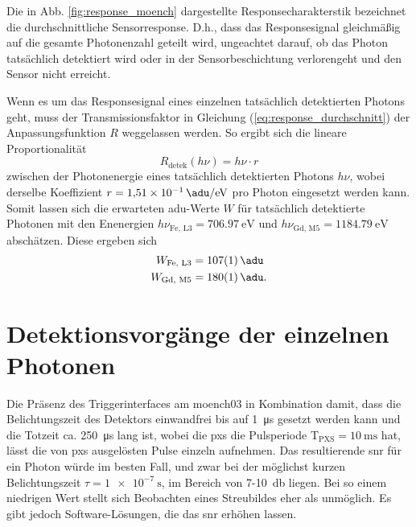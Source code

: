 \noindent
Die in Abb. \ref{fig:response_moench} dargestellte Responsecharakterstik bezeichnet die durchschnittliche Sensorresponse. D.h., dass das Responsesignal gleichmäßig auf die gesamte Photonenzahl geteilt wird, ungeachtet darauf, ob das Photon tatsächlich detektiert wird oder in der Sensorbeschichtung verlorengeht und den Sensor nicht erreicht.

\noindent
Wenn es um das Responsesignal eines einzelnen tatsächlich detektierten Photons geht, muss der Transmissionsfaktor in Gleichung (\ref{eq:response_durchschnitt}) der Anpassungsfunktion $R$ weggelassen werden. So ergibt sich die lineare Proportionalität
\begin{equation}
    R_\text{detek}(h\nu) = h\nu \cdot r
    \label{eq:adu_to_ev}
\end{equation}
zwischen der Photonenergie eines tatsächlich detektierten Photons $h\nu$, wobei derselbe Koeffizient $r = \SI{1.51e-1}{\adu\per\eV}$ pro Photon eingesetzt werden kann. Somit lassen sich die erwarteten \gls{adu}-Werte $W$ für tatsächlich detektierte Photonen mit den Enenergien $h\nu_{\text{Fe, L3}} = \SI{706.97}{\eV}$ und $h\nu_{\text{Gd, M5}} = \SI{1184.79}{\eV}$ abschätzen. Diese ergeben sich 
\begin{equation}
\begin{split}
     W_{\text{Fe, L3}} &=  \SI{107(1)}{\adu}\\
     W_{\text{Gd, M5}} &=  \SI{180(1)}{\adu}.
\end{split}
\label{eq:auselesewerte_fe_gd}
\end{equation}


\section{Detektionsvorgänge der einzelnen Photonen}
\label{text:single_photon_theorie}
Die Präsenz des Triggerinterfaces am \gls{moench03} in Kombination damit, dass die Belichtungszeit des Detektors einwandfrei bis auf \SI{1}{\micro\second} gesetzt werden kann und die Totzeit ca. \SI{250}{\micro\second} lang ist, wobei die \gls{pxs} die Pulsperiode T$_\text{PXS} = \SI{10}{\milli\second}$ hat, lässt die von \gls{pxs} ausgelösten Pulse einzeln aufnehmen. Das resultierende \gls{snr} für ein Photon würde im besten Fall, und zwar bei der möglichst kurzen Belichtungszeit $\tau = \SI{1e-7}{\second}$, im Bereich von 7-\SI{10}{\decibel} liegen. Bei so einem niedrigen Wert stellt sich Beobachten eines Streubildes eher als unmöglich. Es gibt jedoch Software-Lösungen, die das \gls{snr} erhöhen lassen.  


